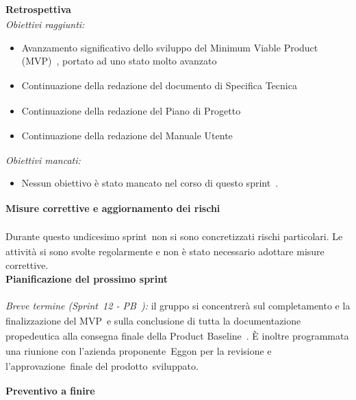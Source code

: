 \documentclass[a4paper,12pt]{article}
\newcommand{\pediceG}{\texorpdfstring{\textsubscript{\scalebox{0.6}{\textbf{G}}}~}{G}}
\begin{document}
\newpage
\noindent\textbf{Retrospettiva\pediceG}\\
\textit{Obiettivi raggiunti:}
\begin{itemize}
    \item Avanzamento significativo dello sviluppo del Minimum Viable Product (MVP)\pediceG, portato ad uno stato molto avanzato
    \item Continuazione della redazione del documento di Specifica Tecnica\pediceG
    \item Continuazione della redazione del Piano di Progetto\pediceG
    \item Continuazione della redazione del Manuale Utente\pediceG
\end{itemize}
\vspace{0.2cm}

\textit{Obiettivi mancati:}
\begin{itemize}
    \item Nessun obiettivo è stato mancato nel corso di questo sprint\pediceG.
\end{itemize}
 
\noindent\textbf{Misure correttive e aggiornamento dei rischi\pediceG}\\\\
Durante questo undicesimo sprint\pediceG non si sono concretizzati rischi particolari. Le attività si sono svolte regolarmente e non è stato necessario adottare misure correttive.\\

 \noindent\textbf{Pianificazione del prossimo sprint}\\\\
\textit{Breve termine (Sprint\pediceG 12 - PB\pediceG):} il gruppo si concentrerà sul completamento e la finalizzazione del MVP\pediceG e sulla conclusione di tutta la documentazione propedeutica alla consegna finale della Product Baseline\pediceG. È inoltre programmata una riunione con l'azienda proponente\pediceG Eggon per la revisione e l'approvazione\pediceG finale del prodotto\pediceG sviluppato.

\vspace{0.4cm}
\noindent\textbf{Preventivo a finire}
 
\end{document}
